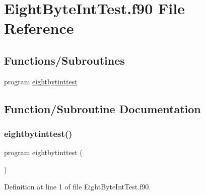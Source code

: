 \hypertarget{EightByteIntTest_8f90}{}\section{Eight\+Byte\+Int\+Test.\+f90 File Reference}
\label{EightByteIntTest_8f90}
\subsection*{Functions/\+Subroutines}
\begin{DoxyCompactItemize}
\item 
program \hyperlink{EightByteIntTest_8f90_a68b454a0650f1f618a0189e4a610c644}{eightbytinttest}
\end{DoxyCompactItemize}


\subsection{Function/\+Subroutine Documentation}
\mbox{\label{EightByteIntTest_8f90_a68b454a0650f1f618a0189e4a610c644}} 
\subsubsection{\texorpdfstring{eightbytinttest()}{eightbytinttest()}}
{\footnotesize\ttfamily program eightbytinttest (\begin{DoxyParamCaption}{ }\end{DoxyParamCaption})}



Definition at line 1 of file Eight\+Byte\+Int\+Test.\+f90.

